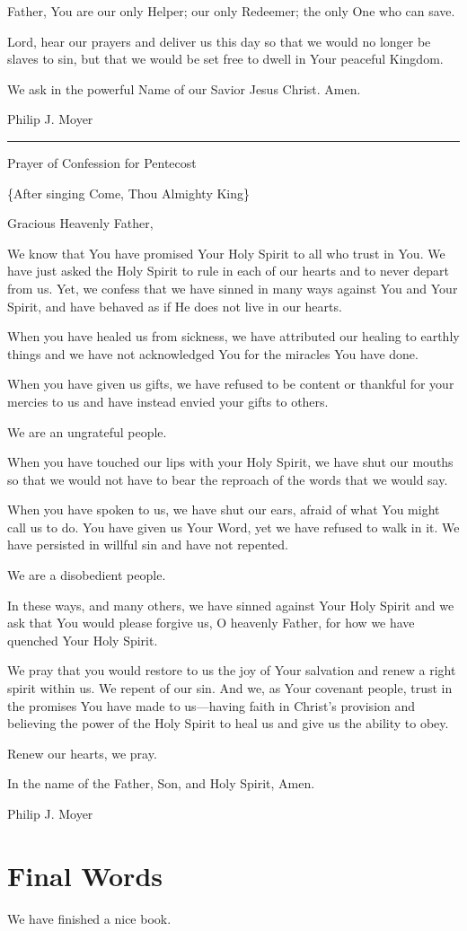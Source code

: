 \documentclass[]{book}
\begin{document}
Father, You are our only Helper; our only Redeemer; the only One who can save.

Lord, hear our prayers and deliver us this day so that we would no longer be slaves to sin, but that we would be set free to dwell in Your peaceful Kingdom.

We ask in the powerful Name of our Savior Jesus Christ. Amen.

Philip J. Moyer

\begin{center}\rule{0.5\linewidth}{\linethickness}\end{center}

Prayer of Confession for Pentecost

\{After singing Come, Thou Almighty King\}

Gracious Heavenly Father,

We know that You have promised Your Holy Spirit to all who trust in You. We have just asked the Holy Spirit to rule in each of our hearts and to never depart from us. Yet, we confess that we have sinned in many ways against You and Your Spirit, and have behaved as if He does not live in our hearts.

When you have healed us from sickness, we have attributed our healing to earthly things and we have not acknowledged You for the miracles You have done.

When you have given us gifts, we have refused to be content or thankful for your mercies to us and have instead envied your gifts to others.

We are an ungrateful people.

When you have touched our lips with your Holy Spirit, we have shut our mouths so that we would not have to bear the reproach of the words that we would say.

When you have spoken to us, we have shut our ears, afraid of what You might call us to do. You have given us Your Word, yet we have refused to walk in it. We have persisted in willful sin and have not repented.

We are a disobedient people.

In these ways, and many others, we have sinned against Your Holy Spirit and we ask that You would please forgive us, O heavenly Father, for how we have quenched Your Holy Spirit.

We pray that you would restore to us the joy of Your salvation and renew a right spirit within us. We repent of our sin. And we, as Your covenant people, trust in the promises You have made to us---having faith in Christ's provision and believing the power of the Holy Spirit to heal us and give us the ability to obey.

Renew our hearts, we pray.

In the name of the Father, Son, and Holy Spirit, Amen.

Philip J. Moyer

\hypertarget{final-words}{%
\chapter{Final Words}\label{final-words}}

We have finished a nice book.


\end{document}
